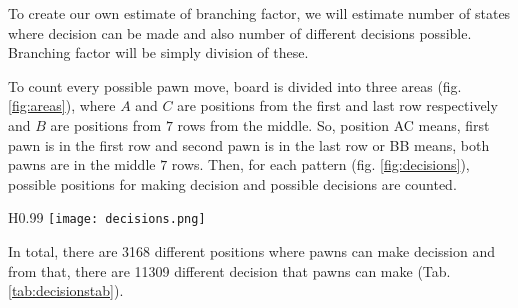 To create our own estimate of branching factor, we will estimate number
of states where decision can be made and also number of different decisions
possible. Branching factor will be simply division of these.

To count every possible pawn move, board is divided into three areas
(fig. \ref{fig:areas}), where $A$ and $C$ are positions from the first
and last row respectively and $B$ are positions from $7$ rows from the middle.
So, position AC means, first pawn is in the first row and second pawn is
in the last row or BB means, both pawns are in the middle $7$ rows. Then, for
each pattern (fig. \ref{fig:decisions}), possible positions for making
decision and possible decisions are counted.

\begin{wrapfigure}{H}{0.99\textwidth}
  \vspace*{-12.60cm}
  \centering
  \texttt{[image: decisions.png]}
  \vspace*{-0.25cm}
  \caption{decision patterns}
  \label{fig:decisions}
  \vspace*{-0.60cm}
\end{wrapfigure}

\vspace{12.00cm}
\nobreakspace
In total, there are 3168 different positions where pawns can make decission and
from that, there are 11309 different decision that pawns can make
(Tab. \ref{tab:decisionstab}).
\newpage

\newcommand{\m}[2]{\multicolumn{1}{|#1}{#2}}
\newcommand{\rr}[6]{
  \m{l}{#1} & \m{r}{#2} & \m{r|}{#3} & & \m{l}{#4} & \m{r}{#5} & \m{r|}{#6} \\
}

